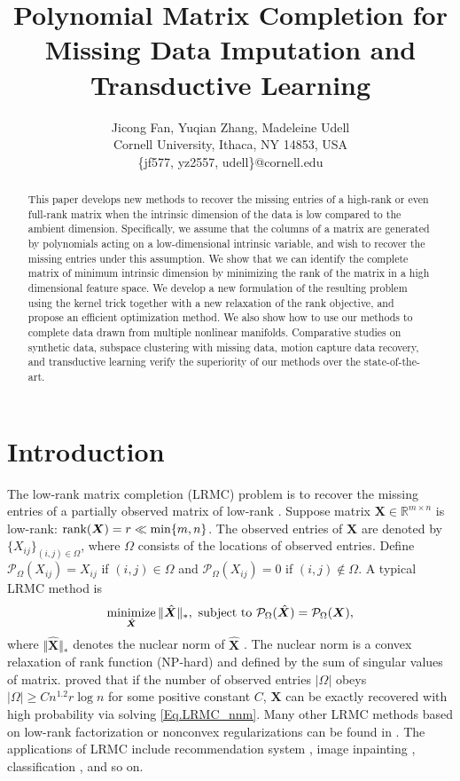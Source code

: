 \documentclass[letterpaper]{article} %
\title{Polynomial Matrix Completion for\\ Missing Data Imputation and Transductive Learning}
\author{Jicong Fan, Yuqian Zhang, Madeleine Udell\\
Cornell University, Ithaca, NY 14853, USA\\
\{jf577, yz2557, udell\}@cornell.edu
}
\begin{document}
\maketitle

\begin{abstract}
This paper develops new methods to recover the missing entries of
a high-rank or even full-rank matrix
when the intrinsic dimension of the data is low compared to the ambient dimension.
Specifically, we assume that the columns of a matrix are generated
by polynomials acting on a low-dimensional intrinsic variable,
and wish to recover the missing entries under this assumption.
We show that we can identify the complete matrix of minimum intrinsic dimension
by minimizing the rank of the matrix in a high dimensional feature space.
We develop a new formulation of the resulting problem
using the kernel trick together with a new relaxation of the rank objective,
and propose an efficient optimization method.
We also show how to use our methods to complete data drawn from multiple nonlinear manifolds.
Comparative studies on synthetic data, subspace clustering with missing data,
motion capture data recovery, and transductive learning verify the superiority of our methods over the state-of-the-art.
\end{abstract}


\section{Introduction}
The low-rank matrix completion (LRMC) problem is to recover the missing entries of a partially observed matrix of low-rank  \cite{CandesRecht2009}. 
Suppose matrix $\bm{X}\in\mathbb{R}^{m\times n}$ is low-rank: $\textup{rank}(\bm{X})=r\ll \min\lbrace m,n\rbrace$. The observed entries of $\bm{X}$ are denoted by $\lbrace X_{ij}\rbrace_{(i,j)\in\Omega}$, where $\Omega$ consists of the locations of observed entries. Define $\mathcal{P}_{\Omega}(X_{ij})=X_{ij}$ if $(i,j)\in\Omega$ and $\mathcal{P}_{\Omega}(X_{ij})=0$ if $(i,j)\notin\Omega$. A typical LRMC method is 
\begin{equation}\label{Eq.LRMC_nnm}
\mathop{\text{minimize}}_{\hat{\bm{X}}}\Vert\hat{\bm{X}}\Vert_\ast,\ \textup{subject to}\ \mathcal{P}_{\Omega}(\hat{\bm{X}})=\mathcal{P}_{\Omega}(\bm{X}),
\end{equation}
where $\Vert\hat{\bm{X}}\Vert_\ast$ denotes the nuclear norm of $\hat{\bm{X}}$ . The nuclear norm is a convex relaxation of rank function (NP-hard) and defined by the sum of singular values of matrix.
\cite{CandesRecht2009} proved that if the number of observed entries $\vert\Omega\vert$ obeys $\vert\Omega\vert\geq Cn^{1.2}r\log n$ for some positive constant $C$, $\bm{X}$ can be exactly recovered with high probability via solving \eqref{Eq.LRMC_nnm}. 
Many other LRMC methods based on low-rank factorization or nonconvex regularizations can be found in \cite{MC_MF_Wen2012,MC_TNNR_PAMI2013,MC_ShattenP_AAAI125165,gu2014weighted,MC_IRRN,icml2014c2_wanga14,mu2016scalable,xie2016weighted,sun2016guaranteed}. The applications of LRMC include recommendation system \cite{Su:2009:SCF:1592474.1722966}, image inpainting \cite{imageinpainting2014}, classification \cite{NIPS2010_3932}, and so on. 
\end{document}
